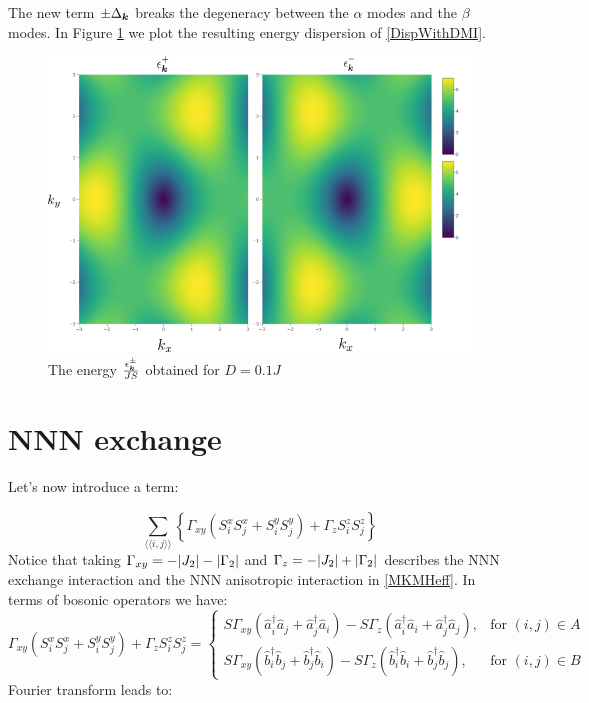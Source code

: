 The new term $\pm \Delta_{\boldsymbol{k}}$ breaks the degeneracy between the $\alpha$ modes and the $\beta$ modes. In Figure \ref{Fig.Magnon.Disp} we plot the resulting energy dispersion of \ref{DispWithDMI}.

\begin{figure}
\centering
  \includegraphics[width=0.7\linewidth]{../Figures/magnon_disp_2.png}
  \caption{The energy $\frac{\epsilon_{\boldsymbol{k}}^\pm}{JS}$ obtained for $D=0.1J$ }
\label{Fig.Magnon.Disp}
\end{figure}

\section{NNN exchange}

Let's now introduce a term:

\begin{equation}
\sum_{\langle \langle i,j \rangle \rangle} \left\{ \Gamma_{xy}(S_i^xS_j^x + S_i^yS_j^y) + \Gamma_zS_i^zS_j^z\right\}
\end{equation}
Notice that taking $\Gamma_{xy} = -\abs{J_2}-\abs{\Gamma_2}$ and $\Gamma_z = -\abs{J_2}+\abs{\Gamma_2}$ describes the NNN exchange interaction and the NNN anisotropic interaction in \ref{MKMHeff}. In terms of bosonic operators we have:
\begin{equation}
\Gamma_{xy}(S_i^xS_j^x + S_i^yS_j^y) + \Gamma_zS_i^zS_j^z = \begin{cases}
             S\Gamma_{xy}(\hat{a}_i^\dagger\hat{a}_j+\hat{a}_j^\dagger\hat{a}_i) - S\Gamma_z(\hat{a}_i^\dagger\hat{a}_i+\hat{a}_j^\dagger\hat{a}_j),  & \text{for } (i,j) \in A \\
             S\Gamma_{xy}(\hat{b}_i^\dagger\hat{b}_j+\hat{b}_j^\dagger\hat{b}_i) - S\Gamma_z(\hat{b}_i^\dagger\hat{b}_i+\hat{b}_j^\dagger\hat{b}_j),  & \text{for } (i,j) \in B
       \end{cases} \quad
\end{equation}
Fourier transform leads to:

